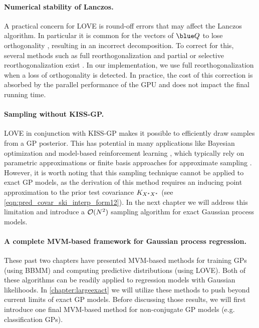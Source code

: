 \paragraph{Numerical stability of Lanczos.}
A practical concern for LOVE{} is round-off errors that may affect the Lanczos algorithm.
In particular it is common for the vectors of $\blue \bQ$ to lose orthogonality \cite{paige1970practical,simon1984lanczos,golub2012matrix}, resulting in an incorrect decomposition.
To correct for this, several methods such as full reorthogonalization and partial or selective reorthogonalization exist \cite{golub2012matrix}.
In our implementation, we use full reorthogonalization when a loss of orthogonality is detected.
In practice, the cost of this correction is absorbed by the parallel performance of the GPU and does not impact the final running time.


\paragraph{Sampling without KISS-GP.}
LOVE in conjunction with KISS-GP makes it possible to efficiently draw samples from a GP posterior.
This has potential in many applications like Bayesian optimization and model-based reinforcement learning \citep[e.g.,][]{deisenroth2011pilco,hernandez2014predictive,wang2017max}, which typically rely on parametric approximations or finite basis approaches for approximate sampling \citep[e.g.][]{deisenroth2011pilco,wang2017max}.
However, it is worth noting that this sampling technique cannot be applied to exact GP models,
as the derivation of this method requires an inducing point approximation to the prior test covariance $K_{X^*X^*}$ (see \cref{eqn:pred_covar_ski_interp_form12}).
In the next chapter we will address this limitation and introduce a $\bigo{N^2}$ sampling algorithm for exact Gaussian process models.

\paragraph{A complete MVM-based framework for Gaussian process regression.}
These past two chapters have presented MVM-based methods for training GPs (using BBMM) and computing predictive distributions (using LOVE).
Both of these algorithms can be readily applied to regression models with Gaussian likelihoods.
In \cref{chapter:largeexact} we will utilize these methods to push beyond current limits of exact GP models.
Before discussing those results, we will first introduce one final MVM-based method for non-conjugate GP models (e.g. classification GPs).
